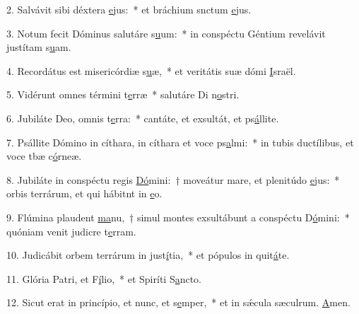 2. Salvávit sibi déxtera \uline{e}jus:~* et bráchium snctum \uline{e}jus.\par 
3. Notum fecit Dóminus salutáre s\uline{u}um:~* in conspéctu Géntium revelávit justítam s\uline{u}am.\par 
4. Recordátus est misericórdiæ s\uline{u}æ,~* et veritátis suæ dómi \uline{I}sraël.\par 
5. Vidérunt omnes términi t\uline{e}rræ~* salutáre Di n\uline{o}stri.\par 
6. Jubiláte Deo, omnis t\uline{e}rra:~* cantáte, et exsultát, et ps\uline{á}llite.\par 
7. Psállite Dómino in cíthara, in cíthara et voce ps\uline{a}lmi:~* in tubis ductílibus, et voce tbæ c\uline{ó}rneæ.\par 
8. Jubiláte in conspéctu regis \uline{Dó}mini:~† moveátur mare, et plenitúdo \uline{e}jus:~* orbis terrárum, et qui hábitnt in \uline{e}o.\par 
9. Flúmina plaudent \uline{ma}nu,~† simul montes exsultábunt a conspéctu D\uline{ó}mini:~* quóniam venit judicre t\uline{e}rram.\par 
10. Judicábit orbem terrárum in just\uline{í}tia,~* et pópulos in quit\uline{á}te.\par 
11. Glória Patri, et F\uline{í}lio,~* et Spiríti S\uline{a}ncto.\par 
12. Sicut erat in princípio, et nunc, et s\uline{e}mper,~* et in sǽcula sæculrum. \uline{A}men.\par 
